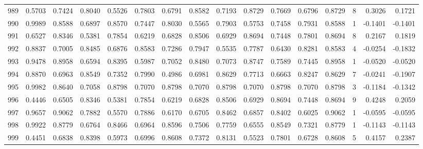 \begin{tabular}{lrrrrrrrrrrrrrrr}
989 &      0.5703 &  0.7424 &  0.8040 &  0.5526 &  0.7803 &  0.6791 &  0.8582 &  0.7193 &  0.8729 &  0.7669 &   0.6796 &     0.8729 &      8 &                    0.3026 &                     0.1721 \\
990 &      0.9989 &  0.8588 &  0.6897 &  0.8570 &  0.7447 &  0.8030 &  0.5565 &  0.7903 &  0.5753 &  0.7458 &   0.7931 &     0.8588 &      1 &                   -0.1401 &                    -0.1401 \\
991 &      0.6527 &  0.8346 &  0.5381 &  0.7854 &  0.6219 &  0.6828 &  0.8506 &  0.6929 &  0.8694 &  0.7448 &   0.7801 &     0.8694 &      8 &                    0.2167 &                     0.1819 \\
992 &      0.8837 &  0.7005 &  0.8485 &  0.6876 &  0.8583 &  0.7286 &  0.7947 &  0.5535 &  0.7787 &  0.6430 &   0.8281 &     0.8583 &      4 &                   -0.0254 &                    -0.1832 \\
993 &      0.9478 &  0.8958 &  0.6594 &  0.8395 &  0.5987 &  0.7052 &  0.8480 &  0.7073 &  0.8747 &  0.7589 &   0.7445 &     0.8958 &      1 &                   -0.0520 &                    -0.0520 \\
994 &      0.8870 &  0.6963 &  0.8549 &  0.7352 &  0.7990 &  0.4986 &  0.6981 &  0.8629 &  0.7713 &  0.6663 &   0.8247 &     0.8629 &      7 &                   -0.0241 &                    -0.1907 \\
995 &      0.9982 &  0.8640 &  0.7058 &  0.8798 &  0.7070 &  0.8798 &  0.7070 &  0.8798 &  0.7070 &  0.8798 &   0.7070 &     0.8798 &      3 &                   -0.1184 &                    -0.1342 \\
996 &      0.4446 &  0.6505 &  0.8346 &  0.5381 &  0.7854 &  0.6219 &  0.6828 &  0.8506 &  0.6929 &  0.8694 &   0.7448 &     0.8694 &      9 &                    0.4248 &                     0.2059 \\
997 &      0.9657 &  0.9062 &  0.7882 &  0.5570 &  0.7886 &  0.6170 &  0.6705 &  0.8462 &  0.6857 &  0.8402 &   0.6025 &     0.9062 &      1 &                   -0.0595 &                    -0.0595 \\
998 &      0.9922 &  0.8779 &  0.6764 &  0.8466 &  0.6964 &  0.8596 &  0.7506 &  0.7759 &  0.6555 &  0.8549 &   0.7321 &     0.8779 &      1 &                   -0.1143 &                    -0.1143 \\
999 &      0.4451 &  0.6838 &  0.8398 &  0.5973 &  0.6996 &  0.8608 &  0.7372 &  0.8131 &  0.5523 &  0.7801 &   0.6728 &     0.8608 &      5 &                    0.4157 &                     0.2387 \\
\bottomrule
\end{tabular}
